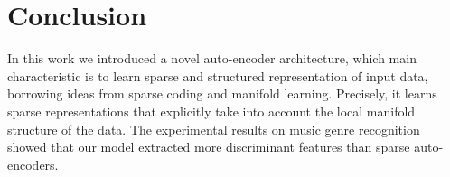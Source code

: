 \documentclass[a4paper,12pt,oneside]{report}
\newcommand{\secref}[1]{Section~\ref{sec:#1}}
\newcommand{\eqnref}[1]{(\ref{eqn:#1})}  %
\begin{document}
\chapter*{Conclusion}

In this work we introduced a novel auto-encoder architecture, which main characteristic is to learn sparse and structured representation of input data, borrowing ideas from sparse coding and manifold learning. Precisely, it learns sparse representations that explicitly take into account the local manifold structure of the data. The experimental results on music genre recognition showed that our model extracted more discriminant features than sparse auto-encoders.




\end{document}
